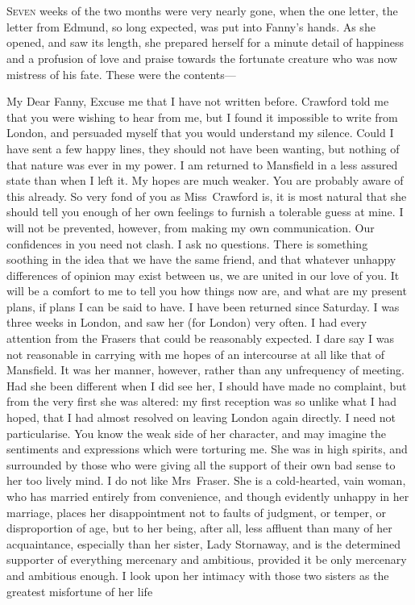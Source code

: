 \chapter[Chapter \thechapter]{} 

\lettrine[lraise=0.3]{S}{even} weeks of the two months were very nearly gone, when the one letter, the letter from Edmund, so long expected, was put into Fanny's hands. As she opened, and saw its length, she prepared herself for a minute detail of happiness and a profusion of love and praise towards the fortunate creature who was now mistress of his fate. These were the contents—
\begin{a4}
	\vspace{-2em}
\end{a4}
\begin{mail}{}{My Dear Fanny,}
Excuse me that I have not written before. Crawford told me that you were wishing to hear from me, but I found it impossible to write from London, and persuaded myself that you would understand my silence. Could I have sent a few happy lines, they should not have been wanting, but nothing of that nature was ever in my power. I am returned to Mansfield in a less assured state than when I left it. My hopes are much weaker. You are probably aware of this already. So very fond of you as Miss~Crawford is, it is most natural that she should tell you enough of her own feelings to furnish a tolerable guess at mine. I will not be prevented, however, from making my own communication. Our confidences in you need not clash. I ask no questions. There is something soothing in the idea that we have the same friend, and that whatever unhappy differences of opinion may exist between us, we are united in our love of you. It will be a comfort to me to tell you how things now are, and what are my present plans, if plans I can be said to have. I have been returned since Saturday. I was three weeks in London, and saw her (for London) very often. I had every attention from the Frasers that could be reasonably expected. I dare say I was not reasonable in carrying with me hopes of an intercourse at all like that of Mansfield. It was her manner, however, rather than any unfrequency of meeting. Had she been different when I did see her, I should have made no complaint, but from the very first she was altered: my first reception was so unlike what I had hoped, that I had almost resolved on leaving London again directly. I need not particularise. You know the weak side of her character, and may imagine the sentiments and expressions which were torturing me. She was in high spirits, and surrounded by those who were giving all the support of their own bad sense to her too lively mind. I do not like Mrs~Fraser. She is a cold-hearted, vain woman, who has married entirely from convenience, and though evidently unhappy in her marriage, places her disappointment not to faults of judgment, or temper, or disproportion of age, but to her being, after all, less affluent than many of her acquaintance, especially than her sister, Lady Stornaway, and is the determined supporter of everything mercenary and ambitious, provided it be only mercenary and ambitious enough. I look upon her intimacy with those two sisters as the greatest misfortune of her life 
\end{mail}
